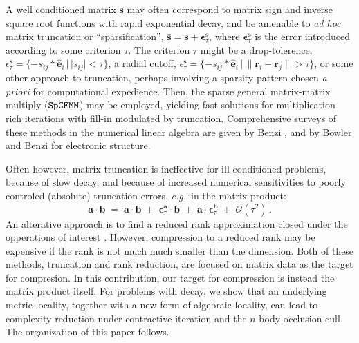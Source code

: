 \documentclass[letterpaper,twocolumn,amsmath,amsfont,amssymb,english,aps,jcp,preprintnumbers,groupaddress,nofootinbib,tightenlines,floatfix]{revtex4}
\newcommand{\mat}[1]{\boldsymbol{#1}}
\theoremstyle{plain}
\theoremstyle{remark}
\theoremstyle{plain}
\begin{document}
A well conditioned matrix $\mat{s}$ may often correspond to matrix
sign and inverse square root functions with rapid exponential decay,
and be amenable to {\em ad hoc} matrix truncation or ``sparsification'', 
$\bar{\mat{s}} = \mat{s}+ \mat{\epsilon}^{\mat{s}}_\tau$,
where $\mat{\epsilon}^{\mat{s}}_\tau$ is the error introduced
according to some criterion $\tau$.  
The criterion $\tau$ might be a drop-tolerence,
$\epsilon^{\mat{s}}_{\tau} = \{-s_{ij}*\hat{\mat{e}}_i \, | \, |s_{ij}|<\tau \}$,
a radial cutoff,
$\epsilon^{\mat{s}}_{\tau} = \{-s_{ij}*\hat{\mat{e}}_i \, | \, \lVert \mat{r}_i - \mat{r}_j \rVert > \tau \}$,
or some other approach to truncation, perhaps involving a sparsity
pattern chosen {\em a priori} for computational expedience.
Then, the sparse general matrix-matrix multiply ($\tt{SpGEMM}$)
\cite{Gustavson78, Toledo97, challacombe00, bowler00} may be employed, yielding fast
solutions for multiplication rich iterations with fill-in modulated by truncation.
Comprehensive surveys of these
methods in the numerical linear algebra are given by Benzi
\cite{Benzi99,Benzi02}, and by Bowler \cite{Bowler12} and Benzi \cite{Benzi13}
for electronic structure.

Often however, matrix truncation is ineffective for ill-conditioned problems, 
because of slow decay, and because of increased numerical sensitivities to poorly 
controled (absolute) truncation errors, {\em e.g.}~in the matrix-product:
\begin{equation} \label{sparseapprox}
\overline{ \mat{a} \cdot \mat{b} }\; = \; \mat{a}\cdot\mat{b} \; +\; \mat{\epsilon}^{\mat{a}}_\tau \cdot \mat{b} \;+\;
 \mat{a} \cdot \mat{\epsilon}^{\mat{b}}_\tau  \; + \;   {\mathcal O}(\tau^2) \, .
\end{equation}
An alterative approach is to find a reduced rank approximation closed under the opperations of interest \cite{HSS}. 
However, compression to a reduced rank may be expensive if the rank is not much much smaller than the dimension.
Both of these methods, truncation and rank reduction, are focused on matrix data as the target for compresion.
In this contribution, our target for compression is instead the matrix product itself.  For problems with
decay, we show that an underlying metric locality, together with a new form of algebraic locality, 
can lead to complexity reduction under contractive iteration and the $n$-body occlusion-cull. The organization of 
this paper follows.
\end{document}
